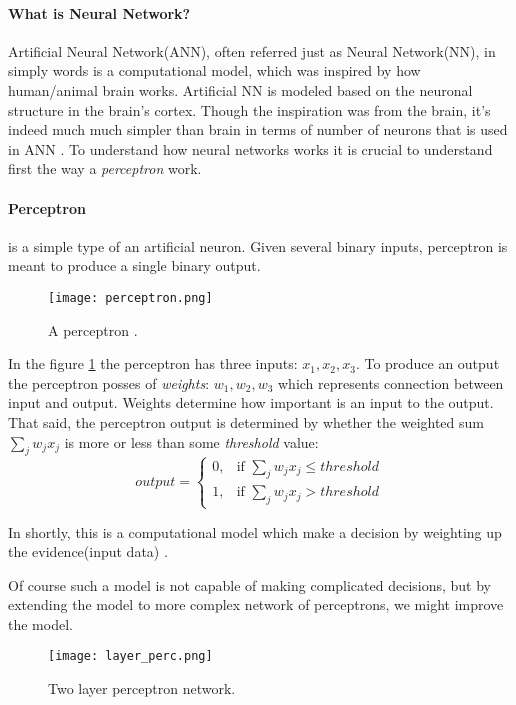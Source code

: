 \paragraph{What is Neural Network?}
Artificial Neural Network(ANN), often referred just as Neural Network(NN),
in simply words is a computational model, which was inspired by how human/animal
brain works. Artificial NN is modeled based on the neuronal structure in the brain's
cortex. Though the inspiration was from the brain,
it's indeed much much simpler than brain in terms of number of neurons that is used
in ANN \cite{Goodfellow-et-al-2016}.
To understand how neural networks works it is crucial to understand first the
way a \emph{perceptron} work.

\paragraph{Perceptron} is a simple type of an artificial neuron.
Given several binary inputs, perceptron is meant to produce a single binary output.
\begin{figure}[H]
	\texttt{[image: perceptron.png]}
	\caption{A perceptron \cite{Nielsen2015}.} %
	\label{img:model} %
\end{figure}
In the figure \ref{img:model} the perceptron has three inputs: $x_1, x_2, x_3$.
To produce an output the perceptron posses of \emph{weights}: $w_1, w_2, w_3$ which represents
connection between input and output. Weights determine how important is an input to the output.
That said, the perceptron output is determined by whether the weighted sum $\sum_j w_j x_j$ is more or less
than some \emph{threshold} value:
\begin{equation} \label{perc:out}
	output = \begin{cases} 0, & \mbox{if } \sum_j w_j x_j \leq threshold \\ 1, & \mbox{if } \sum_j w_j x_j > threshold \end{cases}
\end{equation}

In shortly, this is a computational model which make a decision by weighting up
the evidence(input data) \cite{rosenblatt1962principles}.

Of course such a model is not capable of making complicated decisions, but
by extending the model to more complex network of perceptrons, we might improve the model.

\begin{figure}[H]
	\texttt{[image: layer\_perc.png]}
	\caption{Two layer perceptron network\cite{Nielsen2015}.} %
	\label{img:layer_perc} %
\end{figure}

